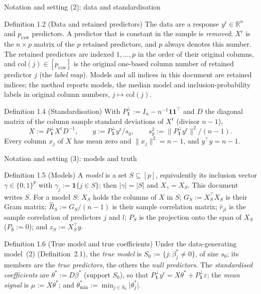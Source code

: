 \documentclass[aspectratio=169]{beamer}
\newcommand{\R}{\mathbb{R}}
\newcommand{\one}{\mathbf{1}}
\newcommand{\ind}[1]{\mathbf{1}\{#1\}}
\newcommand{\set}[1]{[#1]}
\newcommand{\abs}[1]{\lvert #1\rvert}
\newcommand{\norm}[1]{\lVert #1\rVert}
\newcommand{\yr}{y^{\mathrm r}}
\newcommand{\Xr}{X^{\mathrm r}}
\newcommand{\praw}{p_{\mathrm{raw}}}
\newcommand{\bstar}{\beta^*}
\newcommand{\tstar}{\theta^*}
\newcommand{\tmin}{\theta^*_{\min}}
\newcommand{\Sz}{S_0}
\newcommand{\sz}{s_0}
\newcommand{\Rhat}{\hat R}
\begin{document}
\begin{frame}{Notation and setting (2): data and standardisation}
\footnotesize
\begin{block}{Definition 1.2 (Data and retained predictors)}
The data are a response $\yr\in\R^n$ and $\praw$ predictors. A predictor that is constant in the sample is
\emph{removed}; $\Xr$ is the $n\times p$ matrix of the $p$ retained predictors, and $p$ always denotes this number.
The retained predictors are indexed $1,\dots,p$ in the order of their original columns, and $\mathrm{col}(j)\in\set{\praw}$ is the
original one-based column number of retained predictor $j$ (the \emph{label map}). Models and all indices in this
document are retained indices; the method reports models, the median model and inclusion-probability labels in original
column numbers, $j\mapsto\mathrm{col}(j)$.
\end{block}
\begin{block}{Definition 1.4 (Standardisation)}
With $P^\perp_{\one}:=I_n-n^{-1}\one\one^\top$ and $D$ the diagonal matrix of the column sample standard deviations of
$\Xr$ (divisor $n-1$),
\begin{equation}\tag{1}
  X:=P^\perp_{\one}\Xr D^{-1},\qquad y:=P^\perp_{\one}\yr/s_y,\qquad s_y^2:=\norm{P^\perp_{\one}\yr}^2/(n-1).
\end{equation}
Every column $x_j$ of $X$ has mean zero and $\norm{x_j}^2=n-1$, and $y^\top y=n-1$.
\end{block}
\end{frame}

\begin{frame}{Notation and setting (3): models and truth}
\footnotesize
\begin{block}{Definition 1.5 (Models)}
A \emph{model} is a set $S\subseteq\set{p}$, equivalently its inclusion vector $\gamma\in\{0,1\}^p$ with
$\gamma_j:=\ind{j\in S}$; then $\abs{\gamma}=\abs{S}$ and $X_\gamma=X_S$. This document writes $S$. For a model $S$:
$X_S$ holds the columns of $X$ in $S$; $G_S:=X_S^\top X_S$ is their Gram matrix; $\Rhat_S:=G_S/(n-1)$ is their sample
correlation matrix; $\hat r_{jl}$ is the sample correlation of predictors $j$ and $l$; $P_S$ is the projection onto the
span of $X_S$ ($P_\emptyset:=0$); and $z_S:=X_S^\top y$.
\end{block}
\begin{block}{Definition 1.6 (True model and true coefficients)}
Under the data-generating model~\textup{(2)} (Definition~2.1), the \emph{true model} is
$\Sz:=\{j:\beta^*_j\neq0\}$, of size $\sz$; its members are the \emph{true predictors}, the others the \emph{null
predictors}. The \emph{standardised coefficients} are $\tstar:=D\bstar$ (support $\Sz$), so that
$P^\perp_{\one}\yr=X\tstar+P^\perp_{\one}\varepsilon$; the \emph{mean signal} is $\mu:=X\tstar$; and
$\tmin:=\min_{j\in\Sz}\abs{\theta^*_j}$.
\end{block}
\end{frame}
\end{document}
